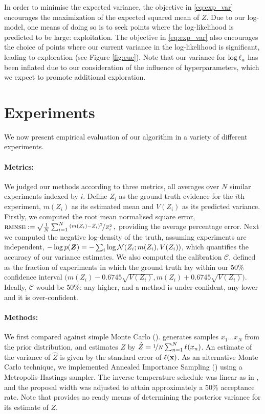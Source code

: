 \documentclass{article}
\begin{document}
In order to minimise the expected variance, the objective in \eqref{eq:exp_var} encourages the maximization of the expected squared mean of $Z$. Due to our log-\gpb model, one means of doing so is to seek points where the log-likelihood is predicted to be large: exploitation.  The objective in \eqref{eq:exp_var} also encourages the choice of points where our current variance in the log-likelihood is significant, leading to exploration (see Figure \ref{fig:eue}). Note that our variance for $\tr_a$ has been inflated due to our consideration of the influence of hyperparameters, which we expect to promote additional exploration.

\section{Experiments}
\label{sec:experiments}



We now present empirical evaluation of our algorithm in a variety of different experiments.

\paragraph{Metrics:} We judged our methods according to three metrics, all averages over $N$ similar experiments indexed by $i$. Define $Z_i$ as the ground truth evidence for the $i$th experiment, $m(Z_i)$ as its estimated mean  and $V(Z_i)$  as its predicted variance. Firstly, we computed the root mean normalised square error,
$
\acro{rmnse} 
\deq \surd\frac{1}{N} \sum_{i=1}^{N} \nicefrac{(m(Z_i) - Z_i)^2}{Z_i^2}\,,
$
providing the average percentage error. Next we computed the negative log-density of the truth, assuming experiments are independent,
$
-\log p(\vect{Z}) = -\sum_i \log \N{Z_i}{m(Z_i)}{V(Z_i)}
$, which quantifies the accuracy of our variance estimates. We also computed the calibration $\mathcal{C}$, defined as the fraction of experiments in which the ground truth lay within our 50\% confidence interval $\bigl(m(Z_i) - 0.6745 \surd{V(Z_i)}, m(Z_i) + 0.6745 \surd{V(Z_i)}\bigr)$. Ideally, $\mathcal{C}$ would be  50\%: any higher, and a method is under-confident, any lower and it is over-confident. 


\paragraph{Methods:} We first compared against simple Monte Carlo ().  generates samples $x_1 \dots x_N$ from the prior distribution, and estimates $Z$ by $\hat{Z} = \nicefrac{1}{N} \sum_{n=1}^{N} \lfn(x_n)$.  An estimate of the variance of $\hat{Z}$ is given by the standard error of $\lfn({\bf x})$. As an alternative Monte Carlo technique, we implemented Annealed Importance Sampling () using a Metropolis-Hastings sampler.  The inverse temperature schedule was linear as in \citet{BZMonteCarlo}, and the proposal width was adjusted to attain approximately a 50\% acceptance rate. Note that  provides no ready means of determining the posterior variance for its  estimate of $Z$.  
\end{document}
